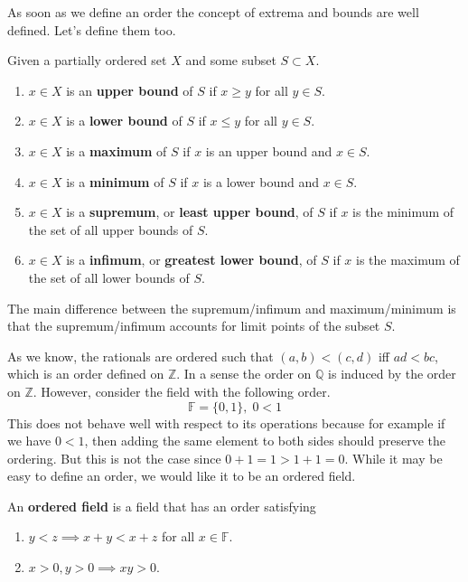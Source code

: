 \documentclass{article}
\begin{document}
      As soon as we define an order the concept of extrema and bounds are well defined. Let's define them too. 

      \begin{definition}
        Given a partially ordered set $X$ and some subset $S \subset X$. 
        \begin{enumerate}
          \item $x \in X$ is an \textbf{upper bound} of $S$ if $x \geq y$ for all $y \in S$. 
          \item $x \in X$ is a \textbf{lower bound} of $S$ if $x \leq y$ for all $y \in S$. 
          \item $x \in X$ is a \textbf{maximum} of $S$ if $x$ is an upper bound and $x \in S$. 
          \item $x \in X$ is a \textbf{minimum} of $S$ if $x$ is a lower bound and $x \in S$. 
          \item $x \in X$ is a \textbf{supremum}, or \textbf{least upper bound}, of $S$ if $x$ is the minimum of the set of all upper bounds of $S$. 
          \item $x \in X$ is a \textbf{infimum}, or \textbf{greatest lower bound}, of $S$ if $x$ is the maximum of the set of all lower bounds of $S$. 
        \end{enumerate}
        The main difference between the supremum/infimum and maximum/minimum is that the supremum/infimum accounts for limit points of the subset $S$. 
      \end{definition}

      As we know, the rationals are ordered such that $(a, b) < (c, d)$ iff $ad < bc$, which is an order defined on $\mathbb{Z}$. In a sense the order on $\mathbb{Q}$ is induced by the order on $\mathbb{Z}$. However, consider the field with the following order. 
      \begin{equation}
        \mathbb{F} = \{0, 1\}, \; 0 < 1
      \end{equation} 
      This does not behave well with respect to its operations because for example if we have $0 < 1$, then adding the same element to both sides should preserve the ordering. But this is not the case since $0 + 1 = 1 > 1 + 1 = 0$. While it may be easy to define an order, we would like it to be an ordered field. 

      \begin{definition}
        An \textbf{ordered field} is a field that has an order satisfying 
        \begin{enumerate}
          \item $y < z \implies x + y < x + z$ for all $x \in \mathbb{F}$. 
          \item $x > 0, y > 0 \implies xy > 0$. 
        \end{enumerate}
      \end{definition}
\end{document}
